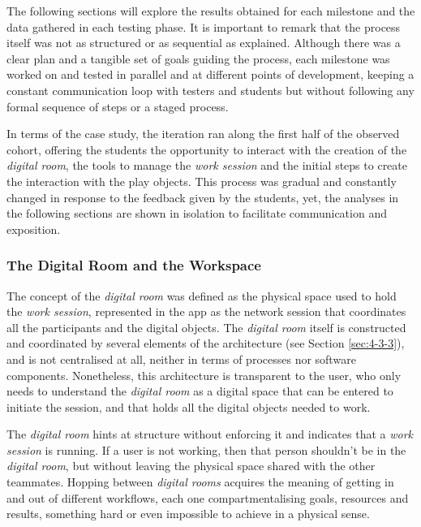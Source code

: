 The following sections will explore the results obtained for each milestone and the data gathered in each testing phase. It is important to remark that the process itself
was not as structured or as sequential as explained. Although there was a clear plan and a tangible set of goals guiding the process, each milestone was worked on and
tested in parallel and at different points of development, keeping a constant communication loop with testers and students but without following any formal sequence of
steps or a staged process. 

In terms of the case study, the iteration ran along the first half of the observed cohort, offering the students the opportunity to interact with the creation of the \emph{digital room},
the tools to manage the \emph{work session} and the initial steps to create the interaction with the play objects. This process was gradual and constantly changed in response to
the feedback given by the students, yet, the analyses in the following sections are shown in isolation to facilitate communication and exposition.

\subsubsection{The Digital Room and the Workspace  \label{sec:5-2-1-1}}

The concept of the \emph{digital room} was defined as the physical space used to hold the \emph{work session}, represented in the app as the network session that
coordinates all the participants and the digital objects. The \emph{digital room} itself is constructed and coordinated by several elements of the architecture (see
Section \ref{sec:4-3-3}), and is not centralised at all, neither in terms of processes nor software components. Nonetheless, this architecture is transparent to the user,
who only needs to understand the \emph{digital room} as a digital space that can be entered to initiate the session, and that holds all the digital objects needed to work.

The \emph{digital room} hints at structure without enforcing it and indicates that a \emph{work session} is running. If a user is not working, then that person shouldn't
be in the \emph{digital room}, but without leaving the physical space shared with the other teammates. Hopping between \emph{digital rooms} acquires the meaning of getting in
and out of different workflows, each one compartmentalising goals, resources and results, something hard or even impossible to achieve in a physical sense.

